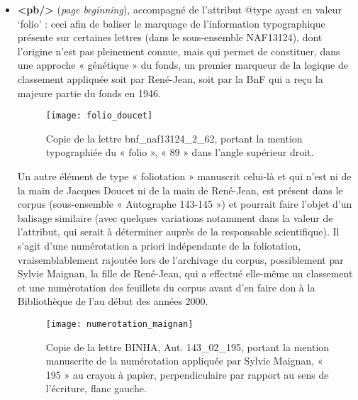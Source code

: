 \begin{itemize}[label=\textbullet]
    \item \textbf{<pb/>} (\textit{page beginning}), accompagné de l’attribut @type ayant en valeur ‘folio’ : ceci afin de baliser le marquage de l’information typographique présente sur certaines lettres (dans le sous-ensemble NAF13124), dont l’origine n’est pas pleinement connue, mais qui permet de constituer, dans une approche « génétique » du fonds, un premier marqueur de la logique de classement appliquée soit par René-Jean, soit par la BnF qui a reçu la majeure partie du fonds en 1946.  

    \begin{figure}[h] 
        \centering 
        \texttt{[image: folio\_doucet]} 
        \caption{Copie de la lettre bnf\_naf13124\_2\_62, portant la mention typographiée du « folio », « 89 » dans l’angle supérieur droit.} 
        \label{fig:doucet-folio} 
    \end{figure}

    Un autre élément de type « foliotation » manuscrit celui-là et qui n’est ni de la main de Jacques Doucet ni de la main de René-Jean, est présent dans le corpus (sous-ensemble « Autographe 143-145 ») et pourrait faire l’objet d’un balisage similaire (avec quelques variations notamment dans la valeur de l’attribut, qui serait à déterminer auprès de la responsable scientifique). Il s’agit d’une numérotation a priori indépendante de la foliotation, vraisemblablement rajoutée lors de l’archivage du corpus, possiblement par Sylvie Maignan, la fille de René-Jean, qui a effectué elle-même un classement et une numérotation des feuillets du corpus avant d’en faire don à la Bibliothèque de l’\inha au début des années 2000. 

    \begin{figure}[h] 
        \centering 
        \texttt{[image: numerotation\_maignan]} 
        \caption{Copie de la lettre BINHA, Aut. 143\_02\_195, portant la mention manuscrite de la numérotation appliquée par Sylvie Maignan, « 195 » au crayon à papier, perpendiculaire par rapport au sens de l’écriture, flanc gauche.} 
        \label{fig:doucet-maignan} 
    \end{figure}


\end{itemize}
